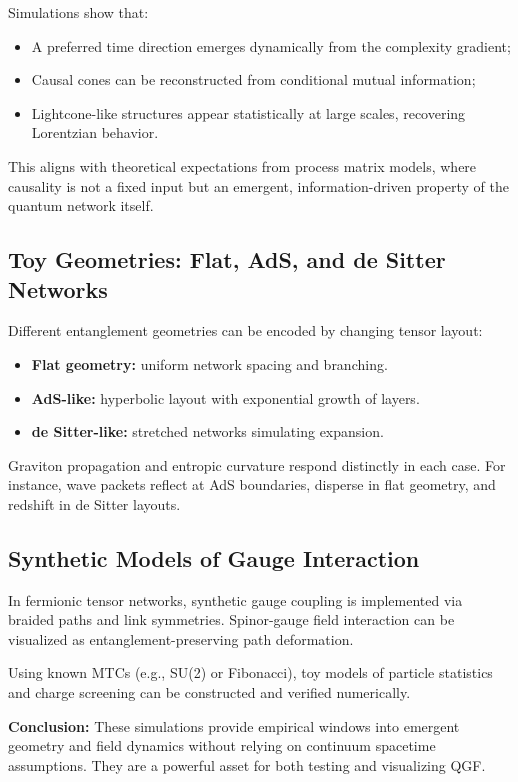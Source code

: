 \documentclass[11pt]{article}
\begin{document}
Simulations show that:
\begin{itemize}
    \item A preferred time direction emerges dynamically from the complexity gradient;
    \item Causal cones can be reconstructed from conditional mutual information;
    \item Lightcone-like structures appear statistically at large scales, recovering Lorentzian behavior.
\end{itemize}

This aligns with theoretical expectations from process matrix models, where causality is not a fixed input but an emergent, information-driven property of the quantum network itself.


\subsection{Toy Geometries: Flat, AdS, and de Sitter Networks}

Different entanglement geometries can be encoded by changing tensor layout:
\begin{itemize}
    \item \textbf{Flat geometry:} uniform network spacing and branching.
    \item \textbf{AdS-like:} hyperbolic layout with exponential growth of layers.
    \item \textbf{de Sitter-like:} stretched networks simulating expansion.
\end{itemize}

Graviton propagation and entropic curvature respond distinctly in each case. For instance, wave packets reflect at AdS boundaries, disperse in flat geometry, and redshift in de Sitter layouts.

\subsection{Synthetic Models of Gauge Interaction}

In fermionic tensor networks, synthetic gauge coupling is implemented via braided paths and link symmetries. Spinor-gauge field interaction can be visualized as entanglement-preserving path deformation.

Using known MTCs (e.g., SU(2) or Fibonacci), toy models of particle statistics and charge screening can be constructed and verified numerically.

\textbf{Conclusion:} These simulations provide empirical windows into emergent geometry and field dynamics without relying on continuum spacetime assumptions. They are a powerful asset for both testing and visualizing QGF.
\end{document}
